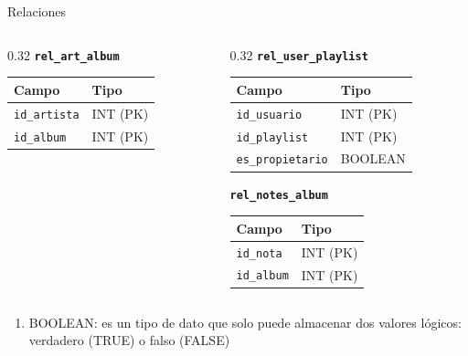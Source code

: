 \documentclass[aspectratio=169, 10pt]{beamer}
\begin{document}
\begin{frame}[t]{Relaciones}
\begin{columns}[T]
\begin{column}{0.32\textwidth}
            \vspace{0.25cm}
            \textbf{\texttt{rel\_art\_album}}\par\vspace{0.05cm}
            \begin{tabular}{ll}
                \toprule
                \textbf{Campo} & \textbf{Tipo} \\
                \midrule
                \texttt{id\_artista} & INT (PK) \\
                \texttt{id\_album} & INT (PK) \\
                \bottomrule
            \end{tabular}
        \end{column}

        \begin{column}{0.32\textwidth}
            \centering
            \textbf{\texttt{rel\_user\_playlist}}\par\vspace{0.05cm}
            \begin{tabular}{ll}
                \toprule
                \textbf{Campo} & \textbf{Tipo} \\
                \midrule
                \texttt{id\_usuario} & INT (PK) \\
                \texttt{id\_playlist} & INT (PK) \\
                \texttt{es\_propietario} & BOOLEAN \\
                \bottomrule
            \end{tabular}

            \vspace{0.25cm}
            \textbf{\texttt{rel\_notes\_album}}\par\vspace{0.05cm}
            \begin{tabular}{ll}
                \toprule
                \textbf{Campo} & \textbf{Tipo} \\
                \midrule
                \texttt{id\_nota} & INT (PK) \\
                \texttt{id\_album} & INT (PK) \\
                \bottomrule
            \end{tabular}
        \end{column}
    \end{columns}
    \begin{enumerate}
        \item BOOLEAN: es un tipo de dato que solo puede almacenar dos valores lógicos: verdadero (TRUE) o falso (FALSE)
    \end{enumerate}
\end{frame}
\end{document}
